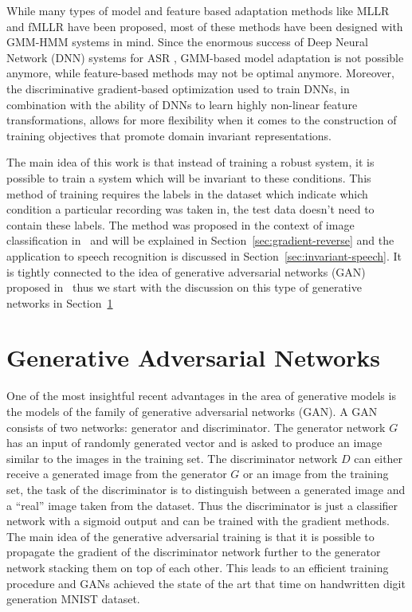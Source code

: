 \documentclass{article}
\begin{document}
    While many types of model and feature based adaptation methods like MLLR and fMLLR
    \cite{leggetter1995maximum} have been proposed, most of these methods have
    been designed with GMM-HMM systems in mind. Since the enormous success of
    Deep Neural Network (DNN) systems for ASR \cite{hinton2012deep}, GMM-based
    model adaptation is not possible anymore, while feature-based methods may
    not be optimal anymore.
    Moreover, the discriminative gradient-based optimization used to train
    DNNs, in combination with the ability of DNNs to learn highly non-linear
    feature transformations, allows for more flexibility when it comes to the
    construction of training objectives that promote domain invariant
    representations.

    The main idea of this work is that instead of training a robust system,
    it is possible to train a system which will be invariant to these 
    conditions. This method of training requires the labels in the dataset
    which indicate which condition a particular recording was taken in, the 
    test data doesn't need to contain these labels. The method was proposed in
    the context of image classification in~\cite{ganin2014unsupervised} and 
    will be explained in Section~\ref{sec:gradient-reverse} and the application 
    to speech recognition is discussed
    in Section~\ref{sec:invariant-speech}. It is tightly connected to the idea
    of generative adversarial networks (GAN) proposed 
    in~\cite{goodfellow2014generative} thus we start with the discussion
    on this type of generative networks in Section~\ref{sec:gans}


\section{Generative Adversarial Networks}
\label{sec:gans}
    One of the most insightful recent advantages in the area of generative models
    is the models of the family of generative adversarial networks (GAN).
    A GAN consists of two networks: generator and discriminator. The generator 
    network $G$ has an
    input of randomly generated vector and is asked to produce an image 
    similar to the images in the training set. The discriminator network $D$
    can either receive a generated image from the generator $G$ or an image
    from the training set, the task of the discriminator is to distinguish
    between a generated image and a ``real'' image taken from the dataset. Thus
    the discriminator is just a classifier network with a sigmoid output
    and can be trained with the gradient methods. The main idea of the generative adversarial
    training is that it is possible to propagate the gradient of the discriminator
    network further to the generator network stacking them on top of each other.
    This leads to an efficient training procedure and GANs achieved the state of the
    art that time on handwritten digit generation MNIST dataset.
\end{document}
